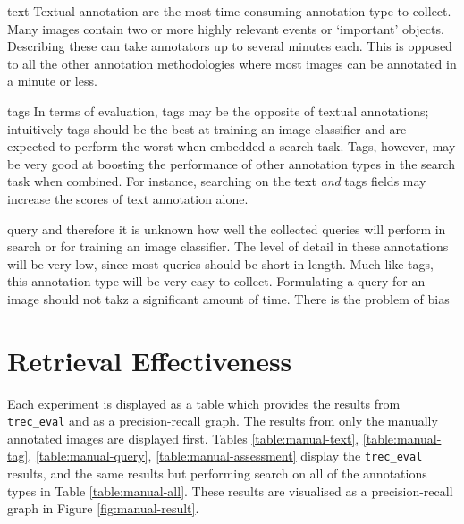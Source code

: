 text
Textual annotation are the most time consuming annotation type to collect. Many images contain two or more highly relevant events or `important' objects. Describing these can take annotators up to several minutes each. This is opposed to all the other annotation methodologies where most images can be annotated in a minute or less.

tags
In terms of evaluation, tags may be the opposite of textual annotations; intuitively tags should be the best at training an image classifier and are expected to perform the worst when embedded a search task. Tags, however, may be very good at boosting the performance of other annotation types in the search task when combined. For instance, searching on the text \textit{and} tags fields may increase the scores of text annotation alone.

query
and therefore it is unknown how well the collected queries will perform in search or for training an image classifier. The level of detail in these annotations will be very low, since most queries should be short in length.
Much like tags, this annotation type will be very easy to collect. Formulating a query for an image should not takz a significant amount of time. There is the problem of bias 

\section{Retrieval Effectiveness}

Each experiment is displayed as a table which provides the results from \verb|trec_eval| and as a precision-recall graph. The results from only the manually annotated images are displayed first. Tables \ref{table:manual-text},  \ref{table:manual-tag}, \ref{table:manual-query}, \ref{table:manual-assessment} display the \verb|trec_eval| results, and the same results but performing search on all of the annotations types in Table \ref{table:manual-all}. These results are visualised as a precision-recall graph in Figure \ref{fig:manual-result}.

